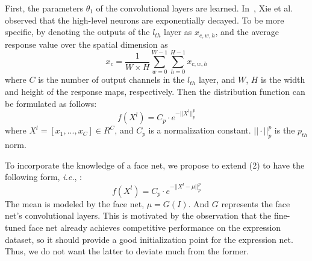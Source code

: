 \documentclass[a4paper, 10pt, conference]{ieeeconf}      %
\begin{document}
First, the parameters $\theta_1$ of the convolutional layers are learned.
In~\cite{xie2016interactive}, Xie et al. observed that the high-level neurons are exponentially decayed. To be more specific, by denoting the outputs of the $l_{th}$ layer as $x_{c,w,h}$, 
and the average response value over the spatial dimension as
\begin{equation}
x_c = \frac{1}{W \times H}\sum_{w=0}^{W-1}\sum_{h=0}^{H-1}x_{c,w,h}
\end{equation}
where $C$ is the number of output channels in the $l_{th}$ layer, and $W$, $H$ is the  width and height of the response maps, respectively.
Then the distribution function can be formulated as follows: 
\begin{equation}
f(X^l) = C_p \cdot e^{-||X^l||_p^p}
\end{equation}
where $X^l = [x_1, ..., x_C] \in R^C$, and $C_p$ is a normalization constant. $||\cdot||_p^p$ is the $p_{th}$ norm. 

To incorporate the knowledge of a face net, we propose to extend (2) to have the following form, \emph{i.e.}, :
\begin{equation}
f(X^l) = C_p \cdot e^{-||X^l - \mu||_p^p}
\end{equation}
The mean is modeled by the face net, $\mu = G(I)$.  And $G$ represents the face net's convolutional layers. 
This is motivated by the observation that the fine-tuned face net already achieves competitive performance on the expression dataset, so it should provide a good initialization point for the expression net. Thus, we do not want the latter to deviate much from the former. 
\end{document}
